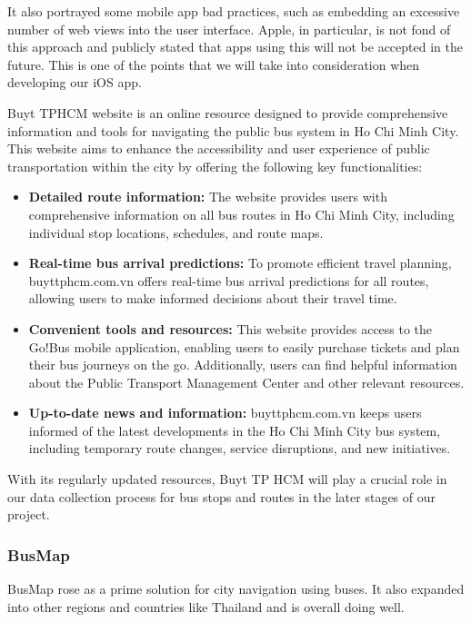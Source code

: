 It also portrayed some mobile app bad practices, such as embedding an excessive number of web views into the user interface. Apple, in particular, is not fond of this approach and publicly stated that apps using this will not be accepted in the future. This is one of the points that we will take into consideration when developing our iOS app.

Buyt TPHCM website is an online resource designed to provide comprehensive information and tools for navigating the public bus system in Ho Chi Minh City. This website aims to enhance the accessibility and user experience of public transportation within the city by offering the following key functionalities:

\begin{itemize}
    \item \textbf{Detailed route information:} The website provides users with comprehensive information on all bus routes in Ho Chi Minh City, including individual stop locations, schedules, and route maps.
    \item \textbf{Real-time bus arrival predictions:} To promote efficient travel planning, buyttphcm.com.vn offers real-time bus arrival predictions for all routes, allowing users to make informed decisions about their travel time.
    \item \textbf{Convenient tools and resources:} This website provides access to the Go!Bus mobile application, enabling users to easily purchase tickets and plan their bus journeys on the go. Additionally, users can find helpful information about the Public Transport Management Center and other relevant resources.
    \item \textbf{Up-to-date news and information:} buyttphcm.com.vn keeps users informed of the latest developments in the Ho Chi Minh City bus system, including temporary route changes, service disruptions, and new initiatives.
\end{itemize}

With its regularly updated resources, Buyt TP HCM will play a crucial role in our data collection process for bus stops and routes in the later stages of our project.

\subsubsection{BusMap}

BusMap rose as a prime solution for city navigation using buses. It also expanded into other regions and countries like Thailand and is overall doing well.


